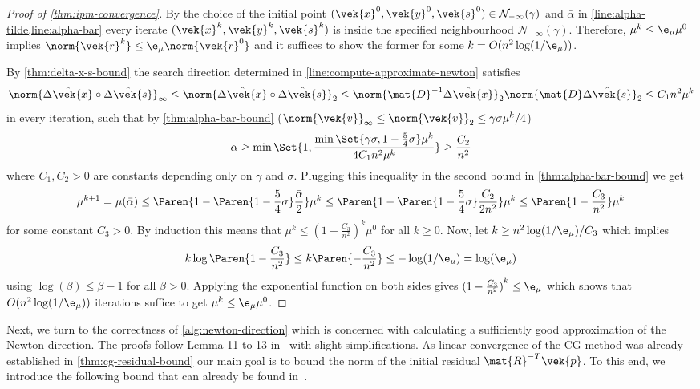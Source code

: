 \begin{proof}[Proof of \cref{thm:ipm-convergence}]
  By the choice of the initial point \((\vek{x}^0, \vek{y}^0, \vek{s}^0) \in \mathcal{N}_{-\infty}(\gamma)\) and \(\bar{\alpha}\) in \cref{line:alpha-tilde,line:alpha-bar} every iterate \((\vek{x}^k, \vek{y}^k, \vek{s}^k)\) is inside the specified neighbourhood \(\mathcal{N}_{-\infty}(\gamma)\).
  Therefore, \(\mu^k \leq \e_\mu \mu^0\) implies \(\norm{\vek{r}^k} \leq \e_\mu \norm{\vek{r}^0}\) and it suffices to show the former for some \(k = O(n^2 \log(1/\e_\mu))\).

  By \cref{thm:delta-x-s-bound} the search direction determined in \cref{line:compute-approximate-newton} satisfies
  \[ \norm{\hat{\Delta\vek{x}} \circ \hat{\Delta\vek{s}}}_\infty \leq \norm{\hat{\Delta\vek{x}} \circ \hat{\Delta\vek{s}}}_2 \leq \norm{\mat{D}^{-1}\hat{\Delta\vek{x}}}_2 \norm{\mat{D}\hat{\Delta\vek{s}}}_2 \leq C_1 n^2 \mu^k\]
  in every iteration, such that by \cref{thm:alpha-bar-bound} (\(\norm{\vek{v}}_\infty \leq \norm{\vek{v}}_2 \leq \gamma \sigma \mu^k/4\))
  \[ \bar{\alpha} \geq \min \Set{1, \frac{\min \Set{\gamma \sigma, 1 - \frac{5}{4}\sigma} \mu^k}{4 C_1 n^2 \mu^k}} \geq \frac{C_2}{n^2} \]
  where \(C_1, C_2 > 0\) are constants depending only on \(\gamma\) and \(\sigma\).
  Plugging this inequality in the second bound in \cref{thm:alpha-bar-bound} we get
  \[ \mu^{k+1} = \mu(\bar{\alpha}) \leq \Paren{ 1 - \Paren{1 - \frac{5}{4} \sigma} \frac{\bar{\alpha}}{2}} \mu^k \leq \Paren{ 1 - \Paren{1 - \frac{5}{4} \sigma} \frac{C_2}{2 n^2}} \mu^k \leq \Paren{1 - \frac{C_3}{n^2}} \mu^k \]
  for some constant \(C_3 > 0\).
  By induction this means that \(\mu^k \leq {(1 - \frac{C_3}{n^2})}^k \mu^0\) for all \(k \geq 0\).
  Now, let \(k \geq n^2 \log(1/\e_\mu) / C_3\) which implies
  \[ k \log\Paren{1 - \frac{C_3}{n^2}} \leq k \Paren{- \frac{C_3}{n^2}} \leq -\log(1/\e_\mu) = \log(\e_\mu) \]
  using \(\log(\beta) \leq \beta-1\) for all \(\beta > 0\).
  Applying the exponential function on both sides gives \({(1 - \frac{C_3}{n^2})}^k \leq \e_\mu\) which shows that \(O(n^2 \log(1/\e_\mu))\) iterations suffice to get \(\mu^k \leq \e_\mu \mu^0\).
\end{proof}

Next, we turn to the correctness of \cref{alg:newton-direction} which is concerned with calculating a sufficiently good approximation of the Newton direction.
The proofs follow Lemma 11 to 13 in~\cite{Avron-FasterRandomizedInfeasibleIPMs} with slight simplifications.
As linear convergence of the CG method was already established in \cref{thm:cg-residual-bound} our main goal is to bound the norm of the initial residual \(\mat{R}^{-T}\vek{p}\).
To this end, we introduce the following bound that can already be found in~\cite{Monteiro-ConvergenceAnalysisLongStepInfeasibleIPMs}.

